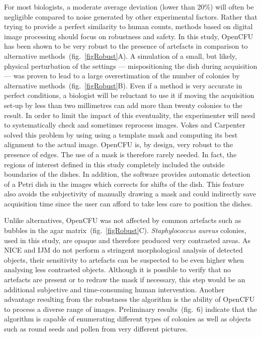 \documentclass[10pt]{article}
\newcommand{\sa}{\emph{Staphylococcus aureus}}
\newcommand{\IJM}{IJM}
\begin{document}
For most biologists, a moderate average deviation (lower than 20\%) will often be
negligible compared to noise generated by other experimental factors.
Rather that trying to provide a perfect similarity to human counts, methods
based on digital image processing should focus on robustness and safety.
In this study, OpenCFU has been shown to be very robust to the presence of
artefacts in comparison to alternative methods~(fig.~\ref{figRobust}A). A
simulation of a small, but likely, physical perturbation of the settings ---
mispositioning the dish during acquisition --- was proven to lead to a large
overestimation of the number of colonies by alternative
methods~(fig.~\ref{figRobust}B).
Even if a method is very accurate in perfect conditions, a biologist will be
reluctant to use it if moving the acquisition set-up by less than two
millimetres can add more than twenty colonies to the result.
In order to limit the impact of this eventuality, the experimenter will need to
systematically check and sometimes reprocess images.
Vokes and Carpenter \cite{vokes_using_2008} solved this problem by using using a
template mask and computing its best alignment to the actual image.
OpenCFU is, by design, very robust to the presence of edges. The use of a mask is
therefore rarely needed. In fact, the regions of interest defined in this study
completely included the outside boundaries of the dishes.
In addition, the software provides automatic detection of a Petri dish
in
the images which corrects for shifts of the dish. This feature also avoids 
the
subjectivity of manually drawing a mask and could indirectly save acquisition
time since the user can afford to take less care to position the dishes.

Unlike alternatives, OpenCFU was not affected by common artefacts such as bubbles
 in the agar matrix~(fig.~\ref{figRobust}C).  
 \sa{} colonies, used in this study, are opaque and therefore produced very
contrasted areas. As NICE and \IJM{} do not perform a stringent
morphological analysis of detected objects, their sensitivity to artefacts can be
suspected to be even higher when analysing less contrasted objects.
Although 
it is possible to verify that no artefacts are present or to redraw the
mask if necessary, this step would be an additional subjective and
time-consuming human intervention.
Another advantage resulting from the robustness the algorithm is the ability of OpenCFU
to process a diverse range of images.
Preliminary results~(fig.~6)
indicate that the algorithm is capable of enumerating different
types of colonies as well as objects such as round seeds and pollen
from very different pictures.
\end{document}
